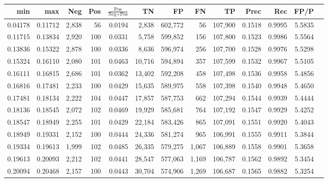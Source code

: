 \begin{tabular}{rrrrrrrrrrrrr}
\toprule
    min &     max &   Neg & Pos & $\frac{\text{Pos}}{\text{Neg}+\text{Pos}}$ &      TN &      FP &      FN &      TP &   Prec &    Rec &   FP/P \\
\midrule
0.04178 & 0.11712 & 2,838 &  56 &                                     0.0194 &   2,838 & 602,772 &      56 & 107,900 & 0.1518 & 0.9995 & 5.5835 \\
0.11715 & 0.13834 & 2,920 & 100 &                                     0.0331 &   5,758 & 599,852 &     156 & 107,800 & 0.1523 & 0.9986 & 5.5564 \\
0.13836 & 0.15322 & 2,878 & 100 &                                     0.0336 &   8,636 & 596,974 &     256 & 107,700 & 0.1528 & 0.9976 & 5.5298 \\
0.15324 & 0.16110 & 2,080 & 101 &                                     0.0463 &  10,716 & 594,894 &     357 & 107,599 & 0.1532 & 0.9967 & 5.5105 \\
0.16111 & 0.16815 & 2,686 & 101 &                                     0.0362 &  13,402 & 592,208 &     458 & 107,498 & 0.1536 & 0.9958 & 5.4856 \\
0.16816 & 0.17481 & 2,233 & 100 &                                     0.0429 &  15,635 & 589,975 &     558 & 107,398 & 0.1540 & 0.9948 & 5.4650 \\
0.17481 & 0.18134 & 2,222 & 104 &                                     0.0447 &  17,857 & 587,753 &     662 & 107,294 & 0.1544 & 0.9939 & 5.4444 \\
0.18136 & 0.18545 & 2,072 & 102 &                                     0.0469 &  19,929 & 585,681 &     764 & 107,192 & 0.1547 & 0.9929 & 5.4252 \\
0.18547 & 0.18949 & 2,255 & 101 &                                     0.0429 &  22,184 & 583,426 &     865 & 107,091 & 0.1551 & 0.9920 & 5.4043 \\
0.18949 & 0.19331 & 2,152 & 100 &                                     0.0444 &  24,336 & 581,274 &     965 & 106,991 & 0.1555 & 0.9911 & 5.3844 \\
0.19334 & 0.19613 & 1,999 & 102 &                                     0.0485 &  26,335 & 579,275 &   1,067 & 106,889 & 0.1558 & 0.9901 & 5.3658 \\
0.19613 & 0.20093 & 2,212 & 102 &                                     0.0441 &  28,547 & 577,063 &   1,169 & 106,787 & 0.1562 & 0.9892 & 5.3454 \\
0.20094 & 0.20468 & 2,157 & 100 &                                     0.0443 &  30,704 & 574,906 &   1,269 & 106,687 & 0.1565 & 0.9882 & 5.3254 \\

\end{tabular}
